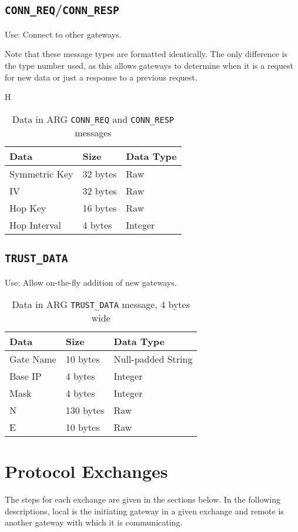 \subsection{\texttt{CONN\_REQ}/\texttt{CONN\_RESP}}
\par Use: Connect to other gateways.

\par Note that these message types are formatted identically. The only difference is the type number used, as this allows gateways to determine when it is a request for new data or just a response to a previous request.

\begin{table}{H}
\caption{Data in \ac{ARG} \texttt{CONN\_REQ} and \texttt{CONN\_RESP} messages}
\label{tbl:arg_conn_data_struct}
\centering
\begin{tabular}{l|l|l}
\textbf{Data} & \textbf{Size} & \textbf{Data Type}\\
\hline
Symmetric Key & 32 bytes & Raw\\
\ac{IV} & 32 bytes & Raw\\
Hop Key & 16 bytes & Raw\\
Hop Interval & 4 bytes & Integer
\end{tabular}
\end{table}

\subsection{\texttt{TRUST\_DATA}}
\par Use: Allow on-the-fly addition of new gateways.

\begin{table}[H]
\caption{Data in \ac{ARG} \texttt{TRUST\_DATA} message, 4 bytes wide}
\label{tbl:arg_trust_struct}
\centering
\begin{tabular}{l|l|l}
\textbf{Data} & \textbf{Size} & \textbf{Data Type}\\
\hline
Gate Name & 10 bytes & Null-padded String\\
Base \ac{IP} & 4 bytes & Integer\\
Mask & 4 bytes & Integer\\
N & 130 bytes & Raw\\
E & 10 bytes & Raw
\end{tabular}
\end{table}

\section{Protocol Exchanges}
\label{sec:arg_protocol_exchanges}
\par The steps for each exchange are given in the sections below. In the following descriptions, local is the initiating gateway in a given exchange and remote is another gateway with which it is communicating.

